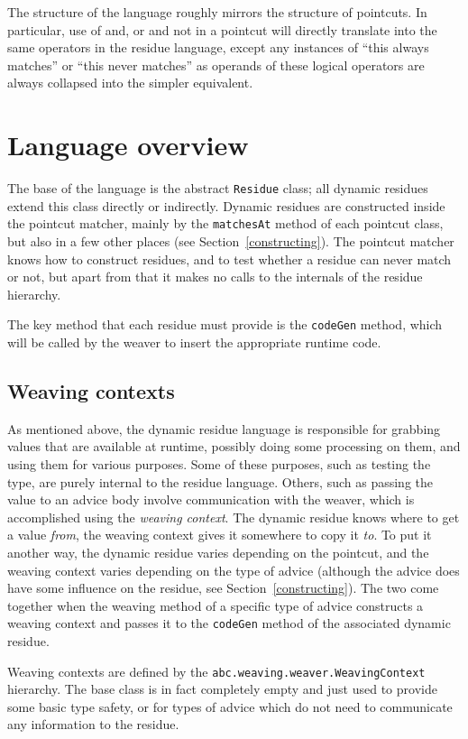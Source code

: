 \documentclass{article}
\begin{document}
The structure of the language roughly mirrors the structure of pointcuts.
In particular, use of and, or and not in a pointcut will directly translate
into the same operators in the residue language, except any instances
of ``this always matches'' or ``this never matches'' as operands of these
logical operators are always collapsed into the simpler equivalent.

\section{Language overview}
The base of the language is the abstract \verb|Residue| class; all dynamic
residues extend this class directly or indirectly. Dynamic residues are
constructed inside the pointcut matcher, mainly by the \verb|matchesAt|
method of each pointcut class, but also in a few other places 
(see Section~\ref{constructing}). The pointcut matcher knows how to 
construct residues, and to test whether a residue can never match or not,
but apart from that it makes no calls to the internals of the residue
hierarchy. 

The key method that each residue must provide is the \verb|codeGen| method,
which will be called by the weaver to insert the appropriate runtime code.

\subsection{Weaving contexts}

As mentioned above, the dynamic residue language is responsible for grabbing
values that are available at runtime, possibly doing some processing on 
them, and using them for various purposes.
Some of these purposes, such as testing the type, are purely internal to
the residue language. Others, such as passing the value to an advice body
involve communication with the weaver, which is accomplished using the
{\em weaving context}. The dynamic residue knows where to get a value
{\em from}, the weaving context gives it somewhere to copy it {\em to}.
To put it another way, the dynamic residue varies depending on the pointcut,
and the weaving context varies depending on the type of advice
(although the advice does have some influence on the residue, see
Section~\ref{constructing}).
The two come
together when the weaving method of a specific type of advice constructs a
weaving context and passes it to the \verb|codeGen| method of the 
associated dynamic residue.

Weaving contexts are defined by the \verb|abc.weaving.weaver.WeavingContext|
hierarchy. The base class is in fact completely empty and just used to provide
some basic type safety, or for types of advice which do not need to communicate
any information to the residue.
\end{document}
